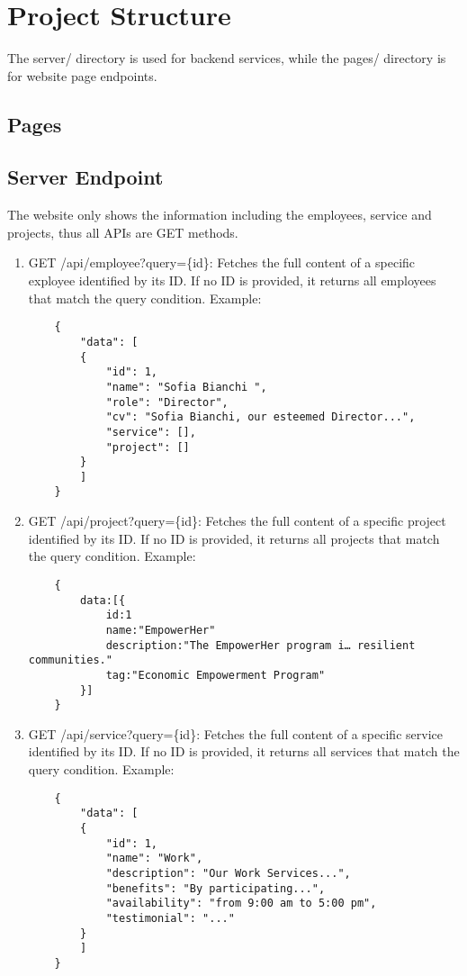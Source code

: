 
\section{Project Structure}
The server/ directory is used for backend services, while the pages/ directory is for website page endpoints.
\subsection{Pages}
\subsection{Server Endpoint}
The website only shows the information including the employees, service and projects, thus all APIs are GET methods.
\begin{enumerate}
	\item GET /api/employee?query=\{id\}: Fetches the full content of a specific exployee identified by its ID. If no ID is provided, it returns all employees that match the query condition.
	Example:
	\begin{verbatim}
	{
		"data": [
		{
			"id": 1,
			"name": "Sofia Bianchi ",
			"role": "Director",
			"cv": "Sofia Bianchi, our esteemed Director...",
			"service": [],
			"project": []
		}
		]
	}
	\end{verbatim}
	\item GET /api/project?query=\{id\}: Fetches the full content of a specific project identified by its ID. If no ID is provided, it returns all projects that match the query condition. 
	Example:
	\begin{verbatim}
	{
		data:[{	
			id:1
			name:"EmpowerHer"
			description:"The EmpowerHer program i… resilient communities."
			tag:"Economic Empowerment Program"
		}]
	}
	\end{verbatim}
	\item GET /api/service?query=\{id\}: Fetches the full content of a specific service identified by its ID. If no ID is provided, it returns all services that match the query condition.
	Example:
	\begin{verbatim}
	{
		"data": [
		{
			"id": 1,
			"name": "Work",
			"description": "Our Work Services...",
			"benefits": "By participating...",
			"availability": "from 9:00 am to 5:00 pm",
			"testimonial": "..."
		}
		]
	}
	\end{verbatim}
\end{enumerate}